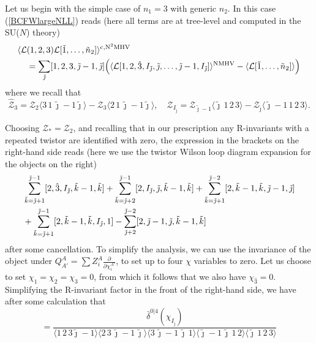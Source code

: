 \documentclass[12pt]{article}
\numberwithin{equation}{section}
\begin{document}
Let us begin with the simple case of \(n_1 = 3\) with generic \(n_2\). In this case (\ref{BCFWlargeNLL}) reads (here all terms are at tree-level and computed in the SU($N$) theory)
\begin{align}
\langle \mathcal{L}&(1,2,3)\mathcal{L}[\tilde{1},\ldots,\tilde{n}_2]\rangle^{\rm{c, N}^2\rm{MHV}} \notag \\
&= \sum_{\tilde{\jmath}}[1,2,3,\tilde{\jmath}-1,\tilde{\jmath}]\Bigl(\langle \mathcal{L}[1,2,\hat{3},I_{\tilde{\jmath}},\tilde{\jmath},\ldots,\tilde{\jmath}-1,I_{\tilde{\jmath}}]\rangle^{\rm NMHV} - \langle \mathcal{L}[\tilde{1},\ldots,\tilde{n}_2]\rangle\Bigr)
\end{align}
where we recall that
\begin{equation}
\widehat{\mathcal{Z}}_3 = \mathcal{Z}_2 \langle 3 \, 1 \, \tilde{\jmath}-1 \tilde{\jmath} \rangle- \mathcal{Z}_3 \langle 2 \, 1 \, \tilde{\jmath}-1 \tilde{\jmath} \rangle , \, \, \, \, \, \, \mathcal{Z}_{I_{\tilde{\jmath}}} = \mathcal{Z}_{\tilde{\jmath}-1} \langle \tilde{\jmath} \, 1 \, 2 \, 3 \rangle - \mathcal{Z}_{\tilde{\jmath}} \langle \tilde{\jmath} -1 \, 1 \, 2 \, 3 \rangle.
\end{equation}

Choosing \(\mathcal{Z}_* = \mathcal{Z}_2\), and recalling that in our prescription any R-invariants with a repeated twistor are identified with zero, the expression in the brackets on the right-hand side reads (here we use the twistor Wilson loop diagram expansion for the objects on the right) 
\begin{align}
&\sum_{\tilde{k}=\tilde{\jmath}+1}^{\tilde{\jmath}-1}[2,\hat{3},I_{\tilde{\jmath}},\tilde{k}-1, \tilde{k}] + \sum_{\tilde{k}=\tilde{\jmath}+2}^{\tilde{\jmath}-1}[2,I_{\tilde{\jmath}},\tilde{\jmath},\tilde{k}-1, \tilde{k}]
+ \sum_{\tilde{k}=\tilde{\jmath}+1}^{\tilde{\jmath}-2}[2,\tilde{k}-1,\tilde{k},\tilde{\jmath}-1,\tilde{\jmath}] \notag \\
& +\sum_{\tilde{k}=\tilde{\jmath}+1}^{\tilde{\jmath}-1}[2,\tilde{k}-1,\tilde{k},I_{\tilde{\jmath}},1] - \sum_{\tilde{\jmath}+2}^{\tilde{\jmath}-2}[2,\tilde{\jmath}-1,\tilde{\jmath},\tilde{k}-1,\tilde{k}]
\label{theSum}
\end{align}
after some cancellation. To simplify the analysis, we can use the invariance of the object under \(Q^A_{A'} = \sum Z_i^A \frac{\partial}{\partial \chi_i^{A'}}\), to set up to four \(\chi\) variables to zero. Let us choose to set \(\chi_1 = \chi_2 = \chi_3 = 0\), from which it follows that we also have \(\chi_{\hat{3}} = 0\). Simplifying the R-invariant factor in the front of the right-hand side, we have after some calculation that
\begin{equation}
[1,2,3,\tilde{\jmath}-1,\tilde{\jmath}] = \frac{\bar{\delta}^{0|4}(\chi_{I_{\tilde{\jmath}}})}{\langle 1\, 2 \, 3 \tilde{\jmath}-1\rangle \langle 2 \, 3 \, \tilde{\jmath}-1 \, \tilde{\jmath} \rangle \langle 3 \, \tilde{\jmath}-1 \, \tilde{\jmath} \, 1\rangle \langle \tilde{\jmath}-1 \, \tilde{\jmath} \, 1 \, 2 \rangle \langle \tilde{\jmath} \, 1 \, 2 \, 3 \rangle }
\end{equation}
\end{document}

